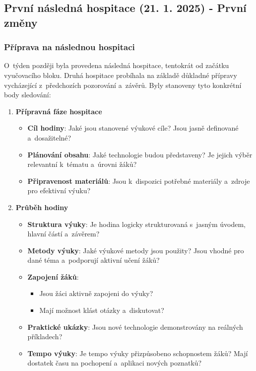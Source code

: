 \subsection{První následná hospitace (21. 1. 2025) - První změny}

\subsubsection*{Příprava na následnou hospitaci}

O~týden později byla provedena následná hospitace, tentokrát od začátku vyučovacího bloku. Druhá hospitace probíhala na základě důkladné přípravy vycházející z~předchozích pozorování a~závěrů. Byly stanoveny tyto konkrétní body sledování:

\begin{enumerate}
    \item \textbf{Přípravná fáze hospitace}
    \begin{itemize}
        \item \textbf{Cíl hodiny}: Jaké jsou stanovené výukové cíle? Jsou jasně definované a~dosažitelné?
        \item \textbf{Plánování obsahu}: Jaké technologie budou představeny? Je jejich výběr relevantní k~tématu a~úrovni žáků?
        \item \textbf{Připravenost materiálů}: Jsou k~dispozici potřebné materiály a~zdroje pro efektivní výuku?
    \end{itemize}

    \item \textbf{Průběh hodiny}
    \begin{itemize}
        \item \textbf{Struktura výuky}: Je hodina logicky strukturovaná s~jasným úvodem, hlavní částí a~závěrem?
        \item \textbf{Metody výuky}: Jaké výukové metody jsou použity? Jsou vhodné pro dané téma a~podporují aktivní učení žáků?
        \item \textbf{Zapojení žáků}:
        \begin{itemize}
            \item Jsou žáci aktivně zapojeni do výuky?
            \item Mají možnost klást otázky a~diskutovat?
        \end{itemize}
        \item \textbf{Praktické ukázky}: Jsou nové technologie demonstrovány na reálných příkladech?
        \item \textbf{Tempo výuky}: Je tempo výuky přizpůsobeno schopnostem žáků? Mají dostatek času na pochopení a~aplikaci nových poznatků?
    \end{itemize}


\end{enumerate}
